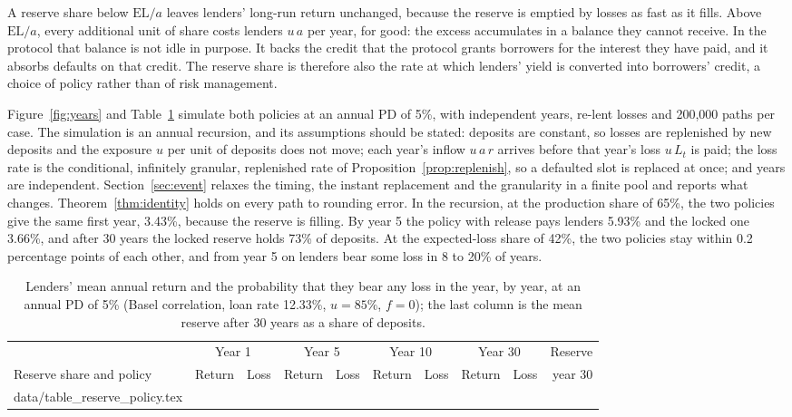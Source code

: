 \documentclass[11pt]{article}
\makeatletter
\theoremstyle{plain}
\theoremstyle{definition}
\newcommand{\inputrows}[1]{\@@input #1 }
\newcommand{\EL}{\mathrm{EL}}
\makeatother
\begin{document}
A reserve share below $\EL/a$ leaves lenders' long-run return unchanged, because the reserve is
emptied by losses as fast as it fills. Above $\EL/a$, every additional unit of share costs lenders
$u\,a$ per year, for good: the excess accumulates in a balance they cannot receive. In the protocol
that balance is not idle in purpose. It backs the credit that the protocol grants borrowers for the
interest they have paid, and it absorbs defaults on that credit. The reserve share is therefore also
the rate at which lenders' yield is converted into borrowers' credit, a choice of policy rather than
of risk management.

Figure~\ref{fig:years} and Table~\ref{tab:policy} simulate both policies at an annual PD of 5\%, with
independent years, re-lent losses and 200,000 paths per case. The simulation is an annual recursion,
and its assumptions should be stated: deposits are constant, so losses are replenished by new deposits
and the exposure $u$ per unit of deposits does not move; each year's inflow $u\,a\,r$ arrives before
that year's loss $u\,L_t$ is paid; the loss rate is the conditional, infinitely granular, replenished
rate of Proposition~\ref{prop:replenish}, so a defaulted slot is replaced at once; and years are
independent. Section~\ref{sec:event} relaxes the timing, the instant replacement and the granularity
in a finite pool and reports what changes. Theorem~\ref{thm:identity} holds on every path to rounding
error. In the recursion, at the production share of 65\%, the two policies give the same first year,
3.43\%, because the reserve is filling. By year 5 the policy with release pays lenders 5.93\% and the
locked one 3.66\%, and after 30 years the locked reserve holds 73\% of deposits. At the expected-loss
share of 42\%, the two policies stay within 0.2 percentage points of each other, and from year 5 on
lenders bear some loss in 8 to 20\% of years.

\begin{table}[ht]
  \centering\small
  \caption{Lenders' mean annual return and the probability that they bear any loss in the year, by
  year, at an annual PD of 5\% (Basel correlation, loan rate 12.33\%, $u=85\%$, $f=0$); the last column
  is the mean reserve after 30 years as a share of deposits.}
  \label{tab:policy}
  \begin{tabular}{lrrrrrrrrr}
    \toprule
    & \multicolumn{2}{c}{Year 1} & \multicolumn{2}{c}{Year 5} & \multicolumn{2}{c}{Year 10} & \multicolumn{2}{c}{Year 30} & Reserve \\
    \cmidrule(lr){2-3}\cmidrule(lr){4-5}\cmidrule(lr){6-7}\cmidrule(lr){8-9}
    Reserve share and policy & Return & Loss & Return & Loss & Return & Loss & Return & Loss & year 30 \\
    \midrule
    \inputrows{data/table_reserve_policy.tex}
    \bottomrule
  \end{tabular}
\end{table}
\end{document}
